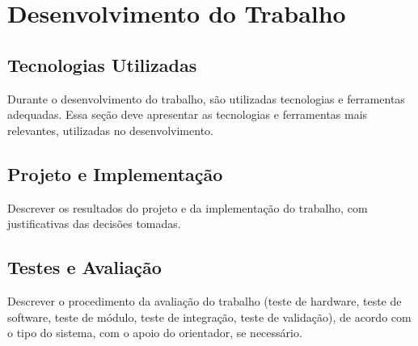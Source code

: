 \chapter{Desenvolvimento do Trabalho} \label{cap:desenvolvimento}

\section{Tecnologias Utilizadas}
Durante o desenvolvimento do trabalho, são utilizadas tecnologias e ferramentas adequadas. Essa seção deve apresentar as tecnologias e ferramentas mais relevantes, utilizadas no desenvolvimento.

\section{Projeto e Implementação}
Descrever os resultados do projeto e da implementação do trabalho, com justificativas das decisões tomadas.

\section{Testes e Avaliação}
Descrever o procedimento da avaliação do trabalho (teste de hardware, teste de software, teste de módulo, teste de integração, teste de validação), de acordo com o tipo do sistema, com o apoio do orientador, se necessário.

\chaptersep
